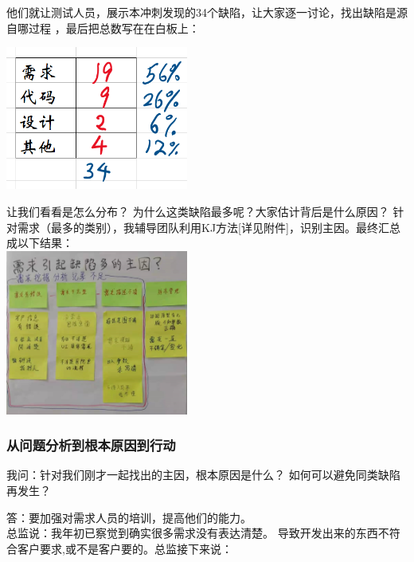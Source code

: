 他们就让测试人员，展示本冲刺发现的34个缺陷，让大家逐一讨论，找出缺陷是源自哪过程
，最后把总数写在在白板上：


\includegraphics[width=6cm]{DefectsBySourceScreenshot_2021-09-20_155232.png}

让我们看看是怎么分布？ 为什么这类缺陷最多呢？大家估计背后是什么原因？
针对需求（最多的类别），我辅导团队利用KJ方法{[}详见附件{]}，识别主因。最终汇总成以下结果：\\

\includegraphics[width=6cm]{reqKJfinal微信图片_20210920125228.jpg}

\hypertarget{ux4eceux95eeux9898ux5206ux6790ux5230ux6839ux672cux539fux56e0ux5230ux884cux52a8}{%
\subsubsection{从问题分析到根本原因到行动}\label{ux4eceux95eeux9898ux5206ux6790ux5230ux6839ux672cux539fux56e0ux5230ux884cux52a8}}

我问：针对我们刚才一起找出的主因，根本原因是什么？
如何可以避免同类缺陷再发生？

答：要加强对需求人员的培训，提高他们的能力。\\
总监说：我年初已察觉到确实很多需求没有表达清楚。
导致开发出来的东西不符合客户要求,或不是客户要的。总监接下来说：

